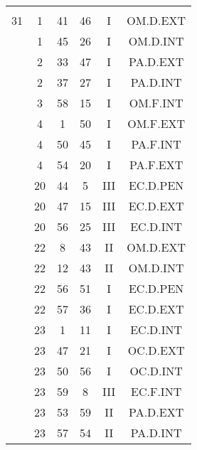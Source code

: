 \documentclass[12pt, a4paper]{article}
\begin{document}
\begin{multicols}{3}
{\begin{tabular}{c c c c c c}
	 	 	 	 & & & & & \\%
	 	 	 	31 & 1 & 41 & 46 & I & OM.D.EXT\\%
	 	 	 	 & 1 & 45 & 26 & I & OM.D.INT\\%
	 	 	 	 & 2 & 33 & 47 & I & PA.D.EXT\\%
	 	 	 	 & 2 & 37 & 27 & I & PA.D.INT\\%
	 	 	 	 & 3 & 58 & 15 & I & OM.F.INT\\%
	 	 	 	 & 4 & 1 & 50 & I & OM.F.EXT\\%
	 	 	 	 & 4 & 50 & 45 & I & PA.F.INT\\%
	 	 	 	 & 4 & 54 & 20 & I & PA.F.EXT\\%
	 	 	 	 & 20 & 44 & 5 & III & EC.D.PEN\\%
	 	 	 	 & 20 & 47 & 15 & III & EC.D.EXT\\%
	 	 	 	 & 20 & 56 & 25 & III & EC.D.INT\\%
	 	 	 	 & 22 & 8 & 43 & II & OM.D.EXT\\%
	 	 	 	 & 22 & 12 & 43 & II & OM.D.INT\\%
	 	 	 	 & 22 & 56 & 51 & I & EC.D.PEN\\%
	 	 	 	 & 22 & 57 & 36 & I & EC.D.EXT\\%
	 	 	 	 & 23 & 1 & 11 & I & EC.D.INT\\%
	 	 	 	 & 23 & 47 & 21 & I & OC.D.EXT\\%
	 	 	 	 & 23 & 50 & 56 & I & OC.D.INT\\%
	 	 	 	 & 23 & 59 & 8 & III & EC.F.INT\\%
	 	 	 	 & 23 & 53 & 59 & II & PA.D.EXT\\%
	 	 	 	 & 23 & 57 & 54 & II & PA.D.INT\\%
	 	 \end{tabular}
 	}
\end{multicols}
\end{document}
